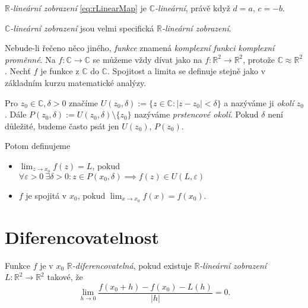 \begin{observation}
$\mathbb{R}$\emph{-lineární zobrazení} \cref{eq:rLinearMap} je $\mathbb{C}$\emph{-lineární}, právě když $d = a$, $ c = -b$.
\end{observation} 

\begin{note}
$\mathbb{C}$\emph{-lineární zobrazení} jsou velmi specifická $\mathbb{R}$\emph{-lineární zobrazení}.
\end{note}

\begin{agreement}
Nebude-li řečeno něco jiného, \emph{funkce} znamená \emph{komplexní funkci komplexní proměnné}. Na $f: \mathbb{C} \to \mathbb{C}$ se můžeme vždy dívat jako na $f: \mathbb{R}^2 \to \mathbb{R}^2$, protože $\mathbb{C}\approx\mathbb{R}^2$.
Nechť $f$ je funkce z $\mathbb{C}$ do $\mathbb{C}$. Spojitost a limita se definuje stejně jako v základním kurzu matematické analýzy.
\end{agreement}

\begin{definition}
Pro $z_0\in\mathbb{C}, \delta>0$ značíme $U(z_0,\delta):= \{z\in\mathbb{C}: |z-z_0|<\delta\}$ a nazýváme ji \emph{okolí} $z_0$. Dále $P(z_0,\delta):= U(z_0,\delta)\setminus\{z_0\}$ nazýváme \emph{prstencové okolí}. Pokud $\delta$ není důležité, budeme často psát jen $U(z_0)$, $P(z_0)$.

Potom definujeme
\begin{itemize}
    \item $\lim_{z\to x_0} {f(z)} = L$, pokud $\forall\varepsilon>0\ \exists\delta>0:z\in P(x_0,\delta)\implies f(z)\in U(L, \varepsilon)$
    \item $f$ je spojitá v $x_0$, pokud $\lim_{x\to x_0}{f(x)} = f(x_0)$.
\end{itemize}
\end{definition} 


\section{Diferencovatelnost}

\begin{definition}
Funkce $f$ je v $x_0$ $\mathbb{R}$\emph{-diferencovatelná}, pokud existuje $\mathbb{R}$\emph{-lineární zobrazení} \\$L: \mathbb{R}^2\to\mathbb{R}^2$ takové, že
$$\lim_{h\to 0}\frac{f(x_0+h)-f(x_0)-L(h)}{|h|} = 0.$$
\end{definition} 

